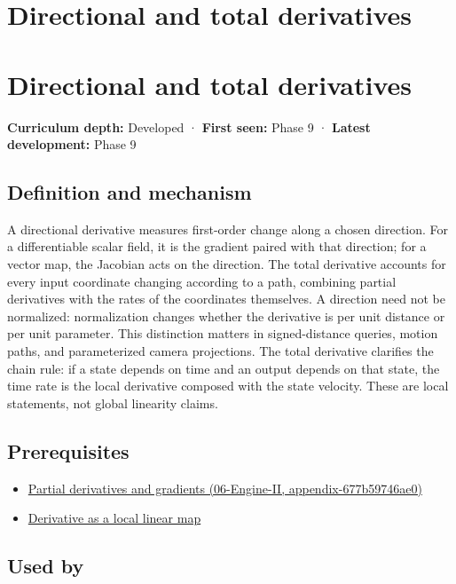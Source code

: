 \hypertarget{appendix-e2d476574aab}{}
\section*{Directional and total derivatives}
\section{Directional and total derivatives}\label{directional-and-total-derivatives}

\textbf{Curriculum depth:} Developed · \textbf{First seen:} Phase 9 · \textbf{Latest development:} Phase 9

\subsection{Definition and mechanism}\label{definition-and-mechanism}

A directional derivative measures first-order change along a chosen direction. For a differentiable scalar field, it is the gradient paired with that direction; for a vector map, the Jacobian acts on the direction. The total derivative accounts for every input coordinate changing according to a path, combining partial derivatives with the rates of the coordinates themselves. A direction need not be normalized: normalization changes whether the derivative is per unit distance or per unit parameter. This distinction matters in signed-distance queries, motion paths, and parameterized camera projections. The total derivative clarifies the chain rule: if a state depends on time and an output depends on that state, the time rate is the local derivative composed with the state velocity. These are local statements, not global linearity claims.

\subsection{Prerequisites}\label{prerequisites}

\begin{itemize}
\tightlist
\item
  \href{}{Partial derivatives and gradients (06-Engine-II, appendix-677b59746ae0)}
\item
  \hyperref[appendix-7bc181935c42]{Derivative as a local linear map}
\end{itemize}

\subsection{Used by}\label{used-by}

